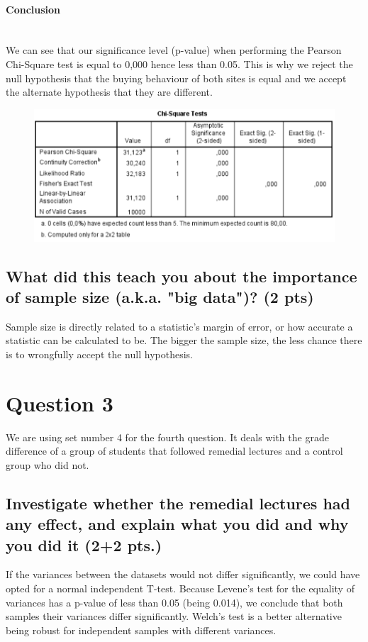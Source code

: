 \documentclass[14]{article}
\begin{document}
\paragraph{Conclusion}\mbox{}\\
We can see that our significance level (p-value) when performing the Pearson Chi-Square test is equal to 0,000 hence less than 0.05. This is why we reject the null hypothesis that the buying behaviour of both sites is equal and we accept the alternate hypothesis that they are different.

\begin{figure}[!htb]
	\includegraphics[width=1.0\textwidth]{img/question2/Question2_b_chi.PNG}
	\captionsetup{width=1.0\textwidth}
	\centering 
\end{figure}

\subsection{What did this teach you about the importance of sample size (a.k.a. "big data")? (2 pts)}
Sample size is directly related to a statistic's margin of error, or how accurate a statistic can be calculated to be. The bigger the sample size, the less chance there is to wrongfully accept the null hypothesis. 

\section{Question 3}
We are using set number 4 for the fourth question. It deals with the grade difference of a group of students that followed remedial lectures and a control group who did not.

\subsection{Investigate whether the remedial lectures had any effect, and explain what you did and why you did it (2+2 pts.)}
If the variances between the datasets would not differ significantly, we could have opted for a normal independent T-test. Because Levene's test for the equality of variances has a p-value of less than 0.05 (being 0.014), we conclude that both samples their variances differ significantly. Welch's test is a better alternative being robust for independent samples with different variances.
\end{document}
